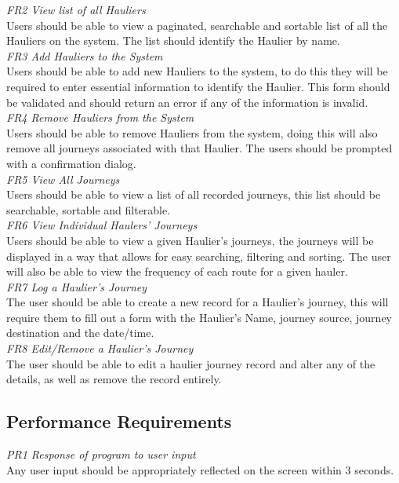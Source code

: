 \documentclass{project}
\begin{document}
\textit{FR2 View list of all Hauliers}\\
Users should be able to view a paginated, searchable and sortable list of all the Hauliers on the system. The list should identify the Haulier by name.\\

\textit{FR3 Add Hauliers to the System}\\
Users should be able to add new Hauliers to the system, to do this they will be required to enter essential information to identify the Haulier. This form should be validated and should return an error if any of the information is invalid. \\

\textit{FR4 Remove Hauliers from the System}\\
Users should be able to remove Hauliers from the system, doing this will also remove all journeys associated with that Haulier. The users should be prompted with a confirmation dialog. \\

\textit{FR5 View All Journeys}\\
Users should be able to view a list of all recorded journeys, this list should be searchable, sortable and filterable.\\

\textit{FR6 View Individual Haulers' Journeys}\\
Users should be able to view a given Haulier's journeys, the journeys will be displayed in a way that allows for easy searching, filtering and sorting. The user will also be able to view the frequency of each route for a given hauler.\\

\textit{FR7 Log a Haulier's Journey}\\
The user should be able to create a new record for a Haulier's journey, this will require them to fill out a form with the Haulier's Name, journey source, journey destination and the date/time.\\

\textit{FR8 Edit/Remove a Haulier's Journey}\\
The user should be able to edit a haulier journey record and alter any of the details, as well as remove the record entirely.\\

\subsection{Performance Requirements}
\textit{PR1 Response of program to user input}\\
Any user input should be appropriately reflected on the screen within 3 seconds.\\
\end{document}
